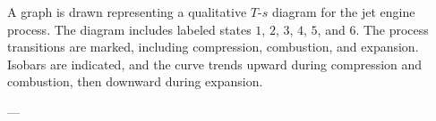 A graph is drawn representing a qualitative \( T \)-\( s \) diagram for the jet engine process. The diagram includes labeled states \( 1 \), \( 2 \), \( 3 \), \( 4 \), \( 5 \), and \( 6 \). The process transitions are marked, including compression, combustion, and expansion. Isobars are indicated, and the curve trends upward during compression and combustion, then downward during expansion.

---